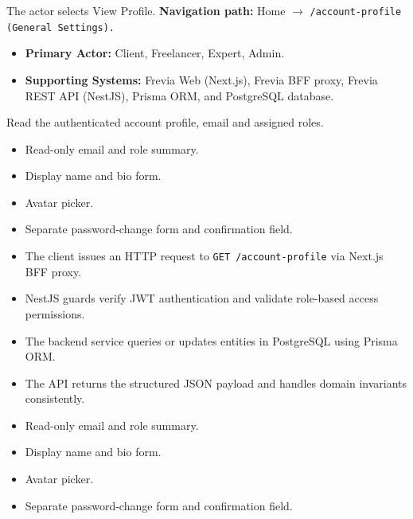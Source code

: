 The actor selects View Profile.\newline
\textbf{Navigation path:} Home $\rightarrow$ \texttt{/\allowbreak{}account-\allowbreak{}profile (General Settings).}


\begin{itemize}[leftmargin=1.6em,topsep=3pt,itemsep=2pt,parsep=0pt,label=$\bullet$]
    \item \textbf{Primary Actor:} Client, Freelancer, Expert, Admin.
    \item \textbf{Supporting Systems:} Frevia Web (Next.js), Frevia BFF proxy, Frevia REST API (NestJS), Prisma ORM, and PostgreSQL database.
\end{itemize}

\noindent Read the authenticated account profile, email and assigned roles.

\begin{itemize}[leftmargin=1.6em,topsep=3pt,itemsep=2pt,parsep=0pt,label=$\bullet$]
    \item Read-only email and role summary.
    \item Display name and bio form.
    \item Avatar picker.
    \item Separate password-change form and confirmation field.
\end{itemize}

\begin{itemize}[leftmargin=1.6em,topsep=3pt,itemsep=2pt,parsep=0pt,label=$\bullet$]
    \item The client issues an HTTP request to \texttt{GET /\allowbreak{}account-\allowbreak{}profile} via Next.js BFF proxy.
    \item NestJS guards verify JWT authentication and validate role-based access permissions.
    \item The backend service queries or updates entities in PostgreSQL using Prisma ORM.
    \item The API returns the structured JSON payload and handles domain invariants consistently.
\end{itemize}

\begin{itemize}[leftmargin=1.6em,topsep=3pt,itemsep=2pt,parsep=0pt,label=$\bullet$]
    \item Read-only email and role summary.
    \item Display name and bio form.
    \item Avatar picker.
    \item Separate password-change form and confirmation field.
\end{itemize}

